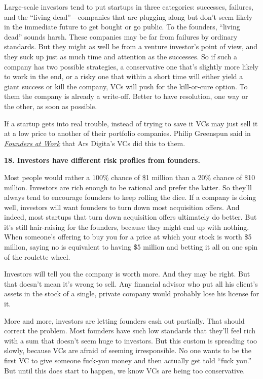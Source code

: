 Large-scale investors tend to put startups in three categories:
successes, failures, and the ``living dead''---companies that are
plugging along but don't seem likely in the immediate future to get
bought or go public. To the founders, ``living dead'' sounds harsh.
These companies may be far from failures by ordinary standards. But they
might as well be from a venture investor's point of view, and they suck
up just as much time and attention as the successes. So if such a
company has two possible strategies, a conservative one that's slightly
more likely to work in the end, or a risky one that within a short time
will either yield a giant success or kill the company, VCs will push for
the kill-or-cure option. To them the company is already a write-off.
Better to have resolution, one way or the other, as soon as possible.

If a startup gets into real trouble, instead of trying to save it VCs
may just sell it at a low price to another of their portfolio companies.
Philip Greenspun said in
\href{http://www.amazon.com/gp/product/1590597141}{\emph{Founders at
Work}} that Ars Digita's VCs did this to them.

\textbf{18. Investors have different risk profiles from founders.}

Most people would rather a 100\% chance of \$1 million than a 20\%
chance of \$10 million. Investors are rich enough to be rational and
prefer the latter. So they'll always tend to encourage founders to keep
rolling the dice. If a company is doing well, investors will want
founders to turn down most acquisition offers. And indeed, most startups
that turn down acquisition offers ultimately do better. But it's still
hair-raising for the founders, because they might end up with nothing.
When someone's offering to buy you for a price at which your stock is
worth \$5 million, saying no is equivalent to having \$5 million and
betting it all on one spin of the roulette wheel.

Investors will tell you the company is worth more. And they may be
right. But that doesn't mean it's wrong to sell. Any financial advisor
who put all his client's assets in the stock of a single, private
company would probably lose his license for it.

More and more, investors are letting founders cash out partially. That
should correct the problem. Most founders have such low standards that
they'll feel rich with a sum that doesn't seem huge to investors. But
this custom is spreading too slowly, because VCs are afraid of seeming
irresponsible. No one wants to be the first VC to give someone fuck-you
money and then actually get told ``fuck you.'' But until this does start
to happen, we know VCs are being too conservative.

